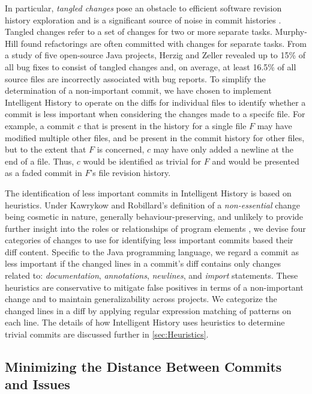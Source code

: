 In particular, \emph{tangled changes} pose an obstacle to efficient software revision history exploration 
and is a significant source of noise in commit histories \cite{herzig_tangled_2013}.
Tangled changes refer to a set of changes for two or more separate tasks. 
Murphy-Hill \etal \cite{murphy-hill_refactor_2012} found refactorings are often committed with changes for separate tasks. 
From a study of five open-source Java projects, Herzig and Zeller \cite{herzig_tangled_2013} revealed up to 15\% of all bug fixes to consist of tangled changes and, 
on average, at least 16.5\% of all source files are incorrectly associated with bug reports. 
To simplify the determination of a non-important commit, we have chosen to implement Intelligent History to operate on
the diffs for individual files to identify whether a commit is less important when considering the changes made to a specifc file. 
For example, a commit $c$ that is present in the history for a single file $F$ may have modified multiple other files, 
and be present in the commit history for other files, but to the extent that $F$ is concerned, 
$c$ may have only added a newline at the end of a file.
Thus, $c$ would be identified as trivial for $F$ and would be presented as a faded commit in $F$'s file revision history.

The identification of less important commits in Intelligent History is based on heuristics.
Under Kawrykow and Robillard's definition of a \emph{non-essential} change being cosmetic in nature, 
generally behaviour-preserving, and unlikely to provide further insight into the roles or relationships of program elements \cite{kawrykow_non-essential_2011}, 
we devise four categories of changes to use for identifying less important commits based their diff content.
Specific to the Java programming language, we regard a commit as less important if the changed lines in a commit's diff contains only changes related to: 
\emph{documentation}, \emph{annotations}, \emph{newlines}, and \emph{import} statements.
These heuristics are conservative to mitigate false positives in terms of a non-important change and to maintain generalizability across projects.
We categorize the changed lines in a diff by applying regular expression matching of patterns on each line.
The details of how Intelligent History uses heuristics to determine trivial commits are discussed further in \autoref{sec:Heuristics}.

\subsection{Minimizing the Distance Between Commits and Issues}
\label{subsec:Minimize-Commit-Issue-Distance}

